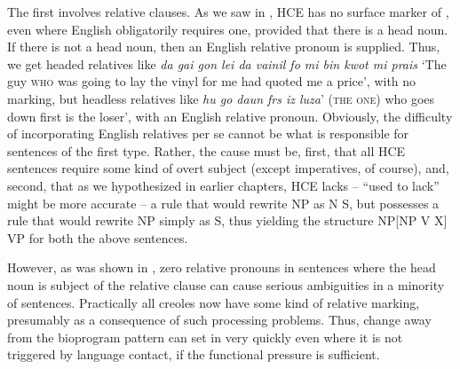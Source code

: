 The first involves relative clauses. As we saw in , HCE has no surface marker of , even where English obligatorily requires one, provided that there is a head noun. If there is not a head noun, then an English relative pronoun is supplied. Thus, we get headed relatives like \textit{da gai gon lei da vainil fo mi bin kwot mi prais} `The guy \textsc{who} was going to lay the vinyl for me had quoted me a price', with no marking, but headless relatives like \textit{hu go daun frs iz luza}' (\textsc{the one}) who goes down first is the loser', with an English relative pro\-noun. Obviously, the difficulty of incorporating English relatives per se cannot be what is responsible for sentences of the first type. Rather, the cause must be, first, that all HCE sentences require some kind of overt subject (except imperatives, of course), and, second, that as we hypothesized in earlier chapters, HCE lacks -- ``used to lack'' might be more accurate -- a rule that would rewrite NP as N S, but possesses a rule that would rewrite NP simply as S, thus yielding the structure NP[NP V X] VP for both the above sentences.

However, as was shown in \citet{BeverEtAl1971}, zero relative pronouns in sentences where the head noun is subject of the relative clause can cause serious ambiguities in a minority of sentences. Practically all creoles now have some kind of relative marking, pre\-sumably as a consequence of such processing problems. Thus, change away from the bioprogram pattern can set in very quickly even where it is not triggered by language contact, if the functional pressure is sufficient.

